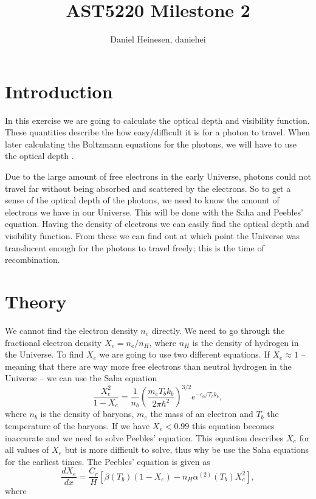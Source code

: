 \documentclass[a4paper,norsk, 10pt]{article}
\title{AST5220 Milestone 2}
\author{Daniel Heinesen, daniehei}
\begin{document}
\maketitle
\section{Introduction}
In this exercise we are going to calculate the optical depth and visibility function. These quantities describe the how easy/difficult it is for a photon to travel.  When later calculating the Boltzmann equations for the photons, we will have to use the optical depth .

Due to the large amount of free electrons in the early Universe, photons could not travel far without being absorbed and scattered by the electrons. So to get a sense of the optical depth of the photons, we need to know the amount of electrons we have in our Universe. This will be done with the Saha and Peebles' equation. Having the density of electrons we can easily find the optical depth and visibility function. From these we can find out at which point the Universe was translucent enough for the photons to travel freely; this is the time of recombination.

\section{Theory}
We cannot find the electron density $n_e$ directly. We need to go through the fractional electron density $X_e = n_e/n_H$, where $n_H$ is the density of hydrogen in the Universe. To find $X_e$ we are going to use two different equations. If $X_e \approx 1$ -- meaning that there are way more free electrons than neutral  hydrogen in the Universe -- we can use the Saha equation
\begin{equation}\label{eq:saha}
\frac{X_e^2}{1-X_e} = \frac{1}{n_b}\left(\frac{m_e T_b k_b}{2\pi \hbar^2}\right)^{3/2} e^{-\epsilon_0/T_b k_b},
\end{equation}
where $n_b$ is the density of baryons, $m_e$ the mass of an electron and $T_b$ the temperature of the baryons. If we have $X_e < 0.99$ this equation becomes inaccurate and we need to solve Peebles' equation. This equation describes $X_e$ for all values of $X_e$ but is more difficult to solve, thus why be use the Saha equations for the earliest times. The Peebles' equation is given as
\begin{equation}\label{eq:peebles}
\frac{dX_e}{dx} = \frac{C_r}{H}\left[\beta (T_b)(1-X_e) - n_H \alpha^{(2)}(T_b)X_e^2 \right],
\end{equation}
where
\end{document}
